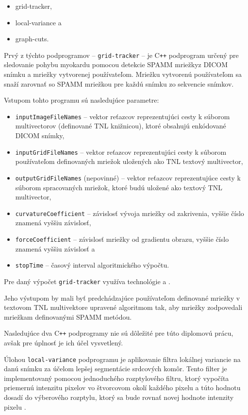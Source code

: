 \begin {itemize}
\item {grid-tracker,}
\item {local-variance a}
\item {graph-cuts.}
\end {itemize}

Prvý z týchto podprogramov -- \texttt{grid-tracker} -- je C\texttt{++} podprogram určený pre sledovanie pohybu myokardu pomocou detekcie SPAMM mriežky\newline z DICOM snímku a mriežky vytvorenej používateľom. Mriežku vytvorenú používateľom sa snaží zarovnať so SPAMM mriežkou pre každú snímku zo sekvencie snímkov.

Vstupom tohto programu sú nasledujúce parametre:
\begin {itemize}
\item {\texttt{inputImageFileNames} -- vektor reťazcov reprezentujúci cesty k súborom multivectorov (definované TNL knižnicou), ktoré obsahujú enkódované DICOM snímky,}
\item {\texttt{inputGridFileNames} -- vektor reťazcov reprezentujúci cesty k súborom používateľom definovaných mriežok uložených ako TNL textový multivector,}
\item {\texttt{outputGridFileNames} (nepovinné) -- vektor reťazcov reprezentujúce cesty k súborom spracovaných mriežok, ktoré budú uložené ako textový TNL multivector,}
\item {\texttt{curvatureCoefficient} -- závislosť vývoja mriežky od zakrivenia, vyššie číslo znamená vyššiu závislosť,}
\item {\texttt{forceCoefficient} -- závislosť mriežky od gradientu obrazu, vyššie číslo znamená vyššiu závislosť a}
\item {\texttt{stopTime} -- časový interval algoritmického výpočtu.}
\end {itemize}

Pre daný výpočet \texttt{grid-tracker} využíva technológie  a .

Jeho výstupom by mali byť predchádzajúce používateľom definované mriežky v textovom TNL multivektore upravené algoritmom tak, aby mriežky zodpovedali mriežkam definovanými SPAMM metódou.

Nasledujúce dva C\texttt{++} podprogramy nie sú dôležité pre túto diplomovú prácu, avšak pre úplnosť je ich účel vysvetlený.

Úlohou \texttt{local-variance} podprogramu je aplikovanie filtra lokálnej variancie na danú snímku za účelom lepšej segmentácie srdcových komôr. Tento filter je implementovaný pomocou jednoduchého rozptylového filtru, ktorý vypočíta priemernú intenzitu pixelov vo štvorcovom okolí každého pixelu a túto hodnotu dosadí do výberového rozptylu, ktorý sa bude rovnať novej hodnote intenzity pixelu \cite{master_thesis_app}.

